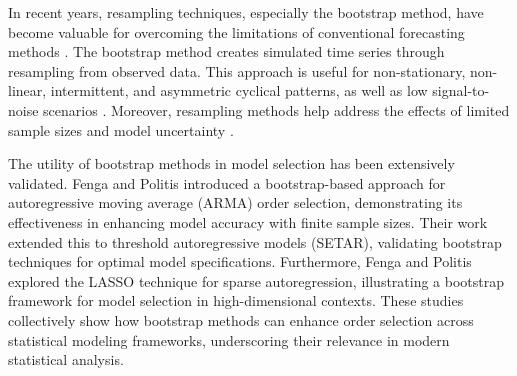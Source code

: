 \documentclass[preprint,11pt,authoryear]{elsarticle}
\begin{document}

In recent years, resampling techniques, especially the bootstrap method, have become valuable for overcoming the limitations of conventional forecasting methods \citep{hasni2019spare}. The bootstrap method creates simulated time series through resampling from observed data. This approach is useful for non-stationary, non-linear, intermittent, and asymmetric cyclical patterns, as well as low signal-to-noise scenarios \citep{feliu2024enhancing, suman2024deep, kreiss2012bootstrap}. Moreover, resampling methods help address the effects of limited sample sizes \citep{davison1997bootstrap}  and model uncertainty \citep{sarris2020exploiting}. 

The utility of bootstrap methods in model selection has been extensively validated. Fenga and Politis \citep{fenga2011bootstrap} introduced a bootstrap-based approach for autoregressive moving average (ARMA) order selection, demonstrating its effectiveness in enhancing model accuracy with finite sample sizes. Their work \citep{fenga2013bootstrap} extended this to threshold autoregressive models (SETAR), validating bootstrap techniques for optimal model specifications. Furthermore, Fenga and Politis \citep{fenga2017lasso} explored the LASSO technique for sparse autoregression, illustrating a bootstrap framework for model selection in high-dimensional contexts. These studies collectively show how bootstrap methods can enhance order selection across statistical modeling frameworks, underscoring their relevance in modern statistical analysis.
\end{document}
